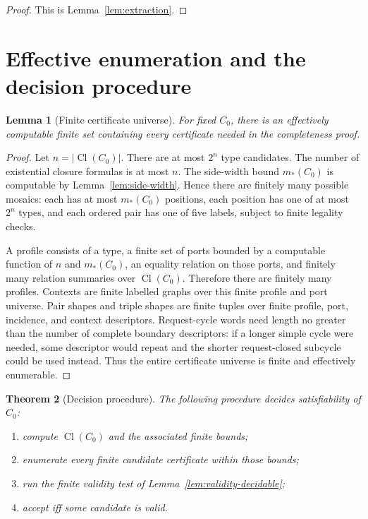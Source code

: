\documentclass[11pt]{article}
\newtheorem{theorem}{Theorem}[section]
\newtheorem{lemma}[theorem]{Lemma}
\newcommand{\Cl}{\operatorname{Cl}}
\begin{document}
\begin{proof}
This is Lemma~\ref{lem:extraction}.
\end{proof}

\section{Effective enumeration and the decision procedure}

\begin{lemma}[Finite certificate universe]\label{lem:finite-universe}
For fixed $C_0$, there is an effectively computable finite set containing every certificate needed in the completeness proof.
\end{lemma}

\begin{proof}
Let $n=|\Cl(C_0)|$.  There are at most $2^n$ type candidates.  The number of existential closure formulas is at most $n$.  The side-width bound $m_*(C_0)$ is computable by Lemma~\ref{lem:side-width}.  Hence there are finitely many possible mosaics: each has at most $m_*(C_0)$ positions, each position has one of at most $2^n$ types, and each ordered pair has one of five labels, subject to finite legality checks.

A profile consists of a type, a finite set of ports bounded by a computable function of $n$ and $m_*(C_0)$, an equality relation on those ports, and finitely many relation summaries over $\Cl(C_0)$.  Therefore there are finitely many profiles.  Contexts are finite labelled graphs over this finite profile and port universe.  Pair shapes and triple shapes are finite tuples over finite profile, port, incidence, and context descriptors.  Request-cycle words need length no greater than the number of complete boundary descriptors: if a longer simple cycle were needed, some descriptor would repeat and the shorter request-closed subcycle could be used instead.  Thus the entire certificate universe is finite and effectively enumerable.
\end{proof}

\begin{theorem}[Decision procedure]\label{thm:decision}
The following procedure decides satisfiability of $C_0$:
\begin{enumerate}[label=(D\arabic*)]
\item compute $\Cl(C_0)$ and the associated finite bounds;
\item enumerate every finite candidate certificate within those bounds;
\item run the finite validity test of Lemma~\ref{lem:validity-decidable};
\item accept iff some candidate is valid.
\end{enumerate}
\end{theorem}
\end{document}
